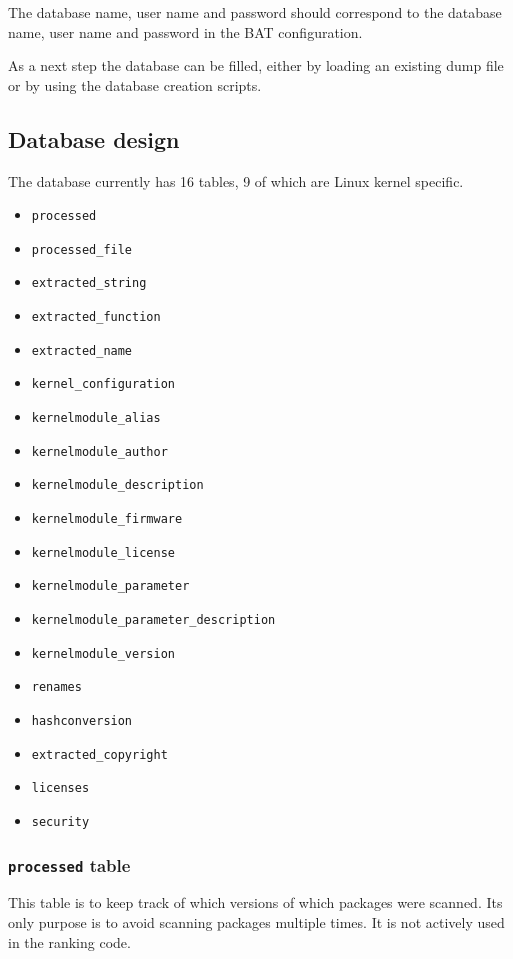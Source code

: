 \documentclass[10pt,a4paper]{article}
\begin{document}
The database name, user name and password should correspond to the database
name, user name and password in the BAT configuration.

As a next step the database can be filled, either by loading an existing dump
file or by using the database creation scripts.

\subsection{Database design}

The database currently has 16 tables, 9 of which are Linux kernel specific.

\begin{itemize}
\item \texttt{processed}
\item \texttt{processed\_file}
\item \texttt{extracted\_string}
\item \texttt{extracted\_function}
\item \texttt{extracted\_name}
\item \texttt{kernel\_configuration}
\item \texttt{kernelmodule\_alias}
\item \texttt{kernelmodule\_author}
\item \texttt{kernelmodule\_description}
\item \texttt{kernelmodule\_firmware}
\item \texttt{kernelmodule\_license}
\item \texttt{kernelmodule\_parameter}
\item \texttt{kernelmodule\_parameter\_description}
\item \texttt{kernelmodule\_version}
\item \texttt{renames}
\item \texttt{hashconversion}
\item \texttt{extracted\_copyright}
\item \texttt{licenses}
\item \texttt{security}
\end{itemize}

\subsubsection{\texttt{processed} table}

This table is to keep track of which versions of which packages were scanned.
Its only purpose is to avoid scanning packages multiple times. It is not
actively used in the ranking code.
\end{document}
